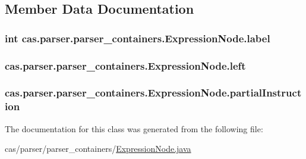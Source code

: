 \subsection{Member Data Documentation}
\hypertarget{classcas_1_1parser_1_1parser__containers_1_1_expression_node_ab6d6903b314dfd5b4b79ccbce24f0631}{
\subsubsection[{label}]{\setlength{\rightskip}{0pt plus 5cm}int cas.\-parser.\-parser\-\_\-containers.\-Expression\-Node.\-label\hspace{0.3cm}{\ttfamily [protected]}}}\label{classcas_1_1parser_1_1parser__containers_1_1_expression_node_ab6d6903b314dfd5b4b79ccbce24f0631}
\hypertarget{classcas_1_1parser_1_1parser__containers_1_1_expression_node_a9ea3bb472e0892da90c7fba6d884d448}{
\subsubsection[{left}]{ cas.\-parser.\-parser\-\_\-containers.\-Expression\-Node.\-left\hspace{0.3cm}{\ttfamily [protected]}}}\label{classcas_1_1parser_1_1parser__containers_1_1_expression_node_a9ea3bb472e0892da90c7fba6d884d448}
\hypertarget{classcas_1_1parser_1_1parser__containers_1_1_expression_node_a6cbe923e93f3ddb3b0484b1625d4f003}{
\subsubsection[{partial\-Instruction}]{ cas.\-parser.\-parser\-\_\-containers.\-Expression\-Node.\-partial\-Instruction\hspace{0.3cm}{\ttfamily [protected]}}}\label{classcas_1_1parser_1_1parser__containers_1_1_expression_node_a6cbe923e93f3ddb3b0484b1625d4f003}


The documentation for this class was generated from the following file\-:\begin{DoxyCompactItemize}
\item 
cas/parser/parser\-\_\-containers/\hyperlink{_expression_node_8java}{Expression\-Node.\-java}\end{DoxyCompactItemize}
